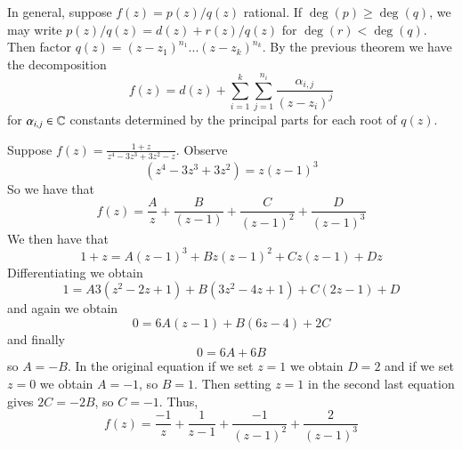 \documentclass[12pt, a4paper, oneside, openright, titlepage]{book}
\begin{document}
\begin{rmk}
    In general, suppose $f(z) = p(z)/q(z)$ rational. If $\deg(p) \geq \deg(q)$, we may write $p(z)/q(z) = d(z)+r(z)/q(z)$ for $\deg(r) < \deg(q)$. Then factor $q(z) = (z-z_1)^{n_1}...(z-z_k)^{n_k}$. By the previous theorem we have the decomposition \begin{equation*}
        f(z) = d(z) + \sum_{i=1}^k\sum_{j=1}^{n_i}\frac{\alpha_{i,j}}{(z-z_i)^j}
    \end{equation*}
    for $\alpha_{i,j} \in \mathbb C$ constants determined by the principal parts for each root of $q(z)$.
\end{rmk}

\begin{eg}
    Suppose $f(z) = \frac{1+z}{z^4-3z^3+3z^2-z}$. Observe \begin{equation*}
        (z^4-3z^3+3z^2) = z(z-1)^3
    \end{equation*}
    So we have that \begin{equation*}
        f(z) = \frac{A}{z}+\frac{B}{(z-1)}+\frac{C}{(z-1)^2}+\frac{D}{(z-1)^3}
    \end{equation*}
    We then have that \begin{equation*}
        1+z = A(z-1)^3+Bz(z-1)^2+Cz(z-1)+Dz
    \end{equation*}
    Differentiating we obtain \begin{equation*}
        1 = A3(z^2-2z+1)+B(3z^2-4z+1)+C(2z-1)+D
    \end{equation*}
    and again we obtain \begin{equation*}
        0 = 6A(z-1)+B(6z-4)+2C
    \end{equation*}
    and finally \begin{equation*}
        0 = 6A+6B
    \end{equation*}
    so $A = -B$. In the original equation if we set $z = 1$ we obtain $D = 2$ and if we set $z = 0$ we obtain $A = -1$, so $B = 1$. Then setting $z = 1$ in the second last equation gives $2C = -2B$, so $C = -1$. Thus, \begin{equation*}
        f(z) = \frac{-1}{z}+\frac{1}{z-1}+\frac{-1}{(z-1)^2}+\frac{2}{(z-1)^3}
    \end{equation*}
\end{eg}
\end{document}
